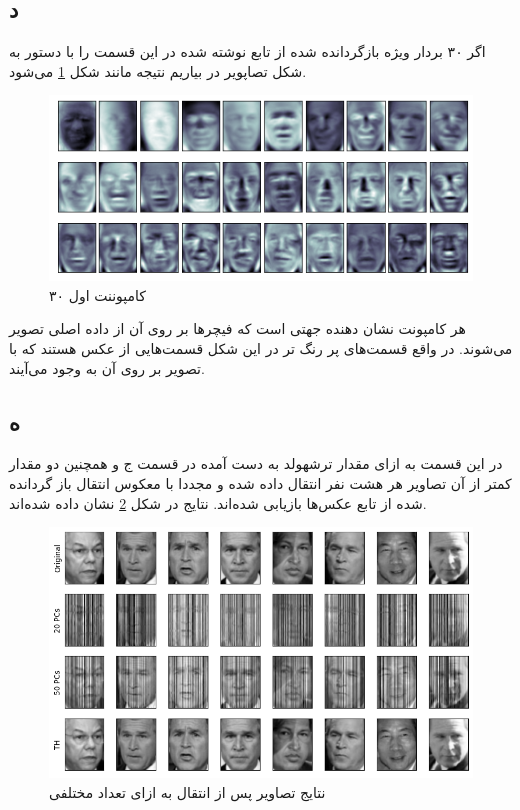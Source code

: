 \documentclass[12pt,onecolumn,a4paper]{article}
\begin{document}
\subsection*{د}
اگر ۳۰ بردار ویژه بازگردانده شده از تابع نوشته شده در این قسمت را با دستور  به شکل تصاپویر در بیاریم نتیجه مانند شکل \ref{fig:6} می‌شود.
\begin{figure}[h!]
    \begin{center}
    \includegraphics[scale=0.55]{plots/q8_d.png}
    \caption{۳۰ کامپوننت اول}
    \label{fig:6}
    \end{center}
\end{figure}
هر کامپونت  نشان دهنده جهتی است که فیچرها بر روی آن از داده اصلی تصویر می‌شوند. در واقع قسمت‌های پر رنگ تر در این شکل قسمت‌هایی از عکس هستند که با تصویر بر روی  آن به وجود می‌آیند.

\subsection*{ه}
در این قسمت به ازای مقدار ترشهولد به دست آمده در قسمت ج و همچنین دو مقدار کمتر از آن تصاویر هر هشت نفر انتقال داده شده و مجددا با معکوس انتقال باز گردانده شده از تابع  عکس‌ها بازیابی شده‌اند. نتایج در شکل \ref{fig:7} نشان داده شده‌اند.
\begin{figure}[h!]
    \begin{center}
    \includegraphics[scale=0.55]{plots/q8_e.png}
    \caption{نتایج  تصاویر پس از انتقال به ازای تعداد مختلفی }
    \label{fig:7}
    \end{center}
\end{figure}
\end{document}
